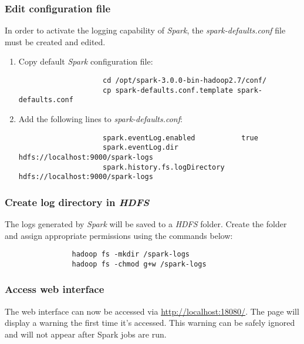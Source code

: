 \documentclass{article}
\begin{document}
            \subsubsection{Edit configuration file}
            In order to activate the logging capability of \emph{Spark}, the \emph{spark-defaults.conf}
            file must be created and edited.
            \begin{enumerate}
                \item Copy default \emph{Spark} configuration file:
                \begin{verbatim}
                    cd /opt/spark-3.0.0-bin-hadoop2.7/conf/
                    cp spark-defaults.conf.template spark-defaults.conf
                \end{verbatim}

                \item Add the following lines to \emph{spark-defaults.conf}:
                \begin{verbatim}
                    spark.eventLog.enabled           true
                    spark.eventLog.dir               hdfs://localhost:9000/spark-logs
                    spark.history.fs.logDirectory    hdfs://localhost:9000/spark-logs
                \end{verbatim}
            \end{enumerate}

            \subsubsection{Create log directory in \emph{HDFS}}
            The logs generated by \emph{Spark} will be saved to a \emph{HDFS} folder. Create the folder
            and assign appropriate permissions using the commands below:
            \begin{verbatim}
                hadoop fs -mkdir /spark-logs
                hadoop fs -chmod g+w /spark-logs
            \end{verbatim}

            \subsubsection{Access web interface}
            The web interface can now be accessed via \url{http://localhost:18080/}. The page will
            display a warning the first time it's accessed. This warning can be safely ignored and will
            not appear after Spark jobs are run.
\end{document}
